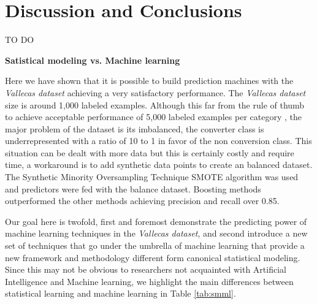 \documentclass[11pt]{article}
\theoremstyle{definition}
\theoremstyle{remark}
\begin{document}
\section{Discussion and Conclusions}
\label{se:dis}
TO DO

\textbf{Satistical modeling vs. Machine learning}

Here we have shown that it is possible to build prediction machines with the \emph{Vallecas dataset} achieving a very satisfactory performance. The \emph{Vallecas dataset} size is around 1,000 labeled examples. Although this far from the rule of thumb to achieve acceptable performance of 5,000 labeled examples per category \cite{goodfellow2016deep}, the major problem of the dataset is its imbalanced, the converter class is underrepresented with a ratio of 10 to 1 in favor of the non conversion class. This situation can be dealt with more data but this is certainly costly and require time, a workaround is to add synthetic data points to create an balanced dataset. The Synthetic Minority Oversampling Technique SMOTE algorithm was used and predictors were fed with the balance dataset. Boosting methods outperformed the other methods achieving precision and recall over 0.85.   

Our goal here is twofold, first and foremost demonstrate the predicting power of machine learning techniques in the \emph{Vallecas dataset}, and second introduce a new set of techniques that go under the umbrella of machine learning that provide a new framework and methodology different form canonical statistical modeling. Since this may not be obvious to researchers not acquainted with Artificial Intelligence and Machine learning, we highlight the main differences between statistical learning and machine learning in  Table \ref{tab:smml}.  
\end{document}
